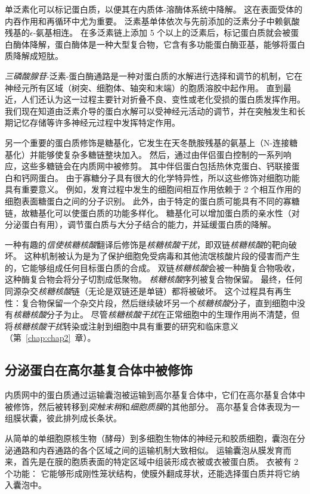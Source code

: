 单泛素化可以标记蛋白质，以便其在内质体-溶酶体系统中降解。
这在表面受体的内吞作用和再循环中尤为重要。
泛素基单体依次与先前添加的泛素分子中赖氨酸残基的$\epsilon$-氨基相连。
在多泛素链上添加 5 个以上的泛素后，标记蛋白质就会被蛋白酶体降解，蛋白酶体是一种大型复合物，它含有多功能蛋白酶亚基，能够将蛋白质降解成短肽。


\textit{三磷酸腺苷}-泛素-蛋白酶通路是一种对蛋白质的水解进行选择和调节的机制，它在神经元所有区域（树突、细胞体、轴突和末端）的胞质溶胶中起作用。
直到最近，人们还认为这一过程主要针对折叠不良、变性或老化受损的蛋白质发挥作用。
我们现在知道由泛素介导的蛋白水解可以受神经元活动的调节，并在突触发生和长期记忆存储等许多神经元过程中发挥特定作用。


另一个重要的蛋白质修饰是糖基化，它发生在天冬酰胺残基的氨基上（N-连接糖基化）并能够使复杂多糖链整块加入。
然后，通过由伴侣蛋白控制的一系列响应，这些多糖链会在内质网中被修剪。
其中伴侣蛋白包括热休克蛋白、钙联接蛋白和钙网蛋白。
由于寡糖分子具有很大的化学特异性，所以这些修饰对细胞功能具有重要意义。
例如，发育过程中发生的细胞间相互作用依赖于 2 个相互作用的细胞表面糖蛋白之间的分子识别。
此外，由于特定的蛋白质可能具有不同的寡糖链，故糖基化可以使蛋白质的功能多样化。
糖基化可以增加蛋白质的亲水性（对分泌蛋白有用），调节蛋白质与大分子结合的能力，并延缓蛋白质的降解。


一种有趣的\textit{信使核糖核酸}翻译后修饰是\textit{核糖核酸干扰}，即双链\textit{核糖核酸}的靶向破坏。
这种机制被认为是为了保护细胞免受病毒和其他流氓核酸片段的侵害而产生的，它能够组成任何目标蛋白质的合成。 
双链\textit{核糖核酸}会被一种酶复合物吸收，这种酶复合物会将分子切割成低聚物。
\textit{核糖核酸}序列被复合物保留。
最终，任何同源杂交\textit{核糖核酸}链（无论是双链还是单链）都将被破坏。
这个过程具有再生性：复合物保留一个杂交片段，然后继续破坏另一个\textit{核糖核酸}分子，直到细胞中没有\textit{核糖核酸}分子为止。
尽管\textit{核糖核酸干扰}在正常细胞中的生理作用尚不清楚，但将\textit{核糖核酸干扰}转染或注射到细胞中具有重要的研究和临床意义（第~\ref{chap:chap2}~章）。



\subsection{分泌蛋白在高尔基复合体中被修饰}

内质网中的蛋白质通过运输囊泡被运输到高尔基复合体中，它们在高尔基复合体中被修饰，然后被转移到\textit{突触末稍}和\textit{细胞质膜}的其他部分。
高尔基复合体表现为一组膜状囊，彼此排列成长条状。


从简单的单细胞原核生物（酵母）到多细胞生物体的神经元和胶质细胞，囊泡在分泌通路和内吞通路的各个区域之间的运输机制大致相似。
运输囊泡从膜发育而来，首先是在膜的胞质表面的特定区域中组装形成衣被或衣被蛋白质。
衣被有 2 个功能：
它能够形成刚性笼状结构，使膜外翻成芽状，还能选择蛋白质并将它纳入囊泡中。


